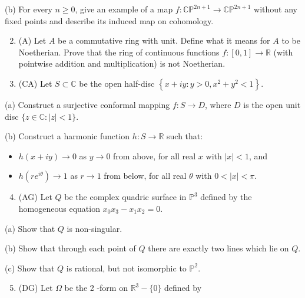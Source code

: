 \documentclass[10pt]{article}
\begin{document}
(b) For every $n \geq 0$, give an example of a map $f: \mathbb{C P}^{2 n+1} \rightarrow \mathbb{C P}^{2 n+1}$ without any fixed points and describe its induced map on cohomology.

\begin{enumerate}
  \setcounter{enumi}{1}
  \item (A) Let $A$ be a commutative ring with unit. Define what it means for $A$ to be Noetherian. Prove that the ring of continuous functions $f:[0,1] \rightarrow \mathbb{R}$ (with pointwise addition and multiplication) is not Noetherian.

  \item (CA) Let $S \subset \mathbb{C}$ be the open half-disc $\left\{x+i y: y>0, x^{2}+y^{2}<1\right\}$.

\end{enumerate}

(a) Construct a surjective conformal mapping $f: S \rightarrow D$, where $D$ is the open unit disc $\{z \in \mathbb{C}:|z|<1\}$.

(b) Construct a harmonic function $h: S \rightarrow \mathbb{R}$ such that:

\begin{itemize}
  \item $h(x+i y) \rightarrow 0$ as $y \rightarrow 0$ from above, for all real $x$ with $|x|<1$, and

  \item $h\left(r e^{i \theta}\right) \rightarrow 1$ as $r \rightarrow 1$ from below, for all real $\theta$ with $0<|x|<\pi$.

\end{itemize}

\begin{enumerate}
  \setcounter{enumi}{3}
  \item (AG) Let $Q$ be the complex quadric surface in $\mathbb{P}^{3}$ defined by the homogeneous equation $x_{0} x_{3}-x_{1} x_{2}=0$.
\end{enumerate}

(a) Show that $Q$ is non-singular.

(b) Show that through each point of $Q$ there are exactly two lines which lie on $Q$.

(c) Show that $Q$ is rational, but not isomorphic to $\mathbb{P}^{2}$.

\begin{enumerate}
  \setcounter{enumi}{4}
  \item (DG) Let $\Omega$ be the 2 -form on $\mathbb{R}^{3}-\{0\}$ defined by
\end{enumerate}
\end{document}
